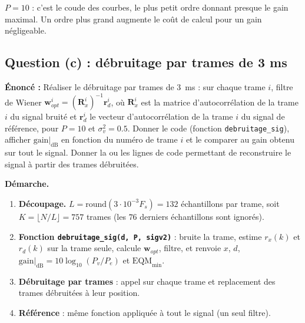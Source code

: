 \begin{resultat}
$P=10$ : c'est le coude des courbes, le plus petit ordre donnant presque le gain maximal. Un ordre plus grand augmente le coût de calcul pour un gain négligeable.
\end{resultat}

\subsection{Question (c) : débruitage par trames de 3 ms}

\begin{enonce}
\textbf{Énoncé :} Réaliser le débruitage par trames de 3~ms : sur chaque trame $i$, filtre de Wiener $\mathbf{w}^i_{opt}=(\mathbf{R}^i_x)^{-1}\mathbf{r}^i_{d}$, où $\mathbf{R}^i_x$ est la matrice d'autocorrélation de la trame $i$ du signal bruité et $\mathbf{r}^i_{d}$ le vecteur d'autocorrélation de la trame $i$ du signal de référence, pour $P=10$ et $\sigma_v^2=0.5$. Donner le code (fonction \texttt{debruitage\_sig}), afficher $\mathrm{gain}|_{\mathrm{dB}}$ en fonction du numéro de trame $i$ et le comparer au gain obtenu sur tout le signal. Donner la ou les lignes de code permettant de reconstruire le signal à partir des trames débruitées.
\end{enonce}

\textbf{Démarche.}
\begin{enumerate}
  \item \textbf{Découpage.} $L=\mathrm{round}(3\cdot10^{-3}F_s)=132$ échantillons par trame, soit $K=\lfloor N/L\rfloor=757$ trames (les $76$ derniers échantillons sont ignorés).
  \item \textbf{Fonction \texttt{debruitage\_sig(d, P, sigv2)}} : bruite la trame, estime $r_x(k)$ et $r_d(k)$ sur la trame seule, calcule $\mathbf{w}_{opt}$, filtre, et renvoie $x$, $\hat d$, $\mathrm{gain}|_{\mathrm{dB}}=10\log_{10}(P_v/P_e)$ et $\mathrm{EQM}_{\min}$.
  \item \textbf{Débruitage par trames} : appel sur chaque trame et replacement des trames débruitées à leur position.
  \item \textbf{Référence} : même fonction appliquée à tout le signal (un seul filtre).
\end{enumerate}

